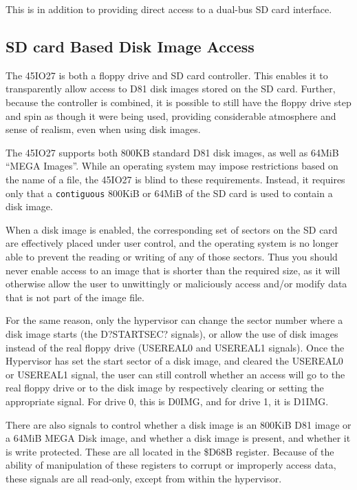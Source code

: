 This is in addition to providing direct access to a dual-bus SD card
interface.

\subsection{SD card Based Disk Image Access}

The 45IO27 is both a floppy drive and SD card controller.
This enables it to transparently allow access to D81 disk images
stored on the SD card.  Further, because the controller is combined,
it is possible to still have the floppy drive step and spin as though
it were being used, providing considerable atmosphere and sense of
realism, even when using disk images.

The 45IO27 supports both 800KB standard D81 disk images, as well as
64MiB ``MEGA Images''.  While an operating system may impose
restrictions based on the name of a file, the 45IO27 is blind to these
requirements. Instead, it requires only that a {\tt contiguous} 800KiB
or 64MiB of the SD card is used to contain a disk image.

When a disk image is enabled, the corresponding set of sectors on the
SD card are effectively placed under user control, and the operating
system is no longer able to prevent the reading or writing of any of
those sectors.  Thus you should never enable access to an image that
is shorter than the required size, as it will otherwise allow the user
to unwittingly or maliciously access and/or modify data that is not
part of the image file.

For the same reason, only the hypervisor can change the sector number
where a disk image starts (the D?STARTSEC? signals), or allow the use
of disk images instead of the real floppy drive (USEREAL0 and USEREAL1
signals).  Once the Hypervisor has set the start sector of a disk
image, and cleared the USEREAL0 or USEREAL1 signal, the user can still
controll whether an access will go to the real floppy drive or to the
disk image by respectively clearing or setting the appropriate
signal.  For drive 0, this is D0IMG, and for drive 1, it is D1IMG.

There are also signals to control whether a disk image is an 800KiB
D81 image or a 64MiB MEGA Disk image, and whether a disk image is
present, and whether it is write protected. These are all located in
the \$D68B register. Because of the ability of manipulation of these
registers to corrupt or improperly access data, these signals are all
read-only, except from within the hypervisor.

